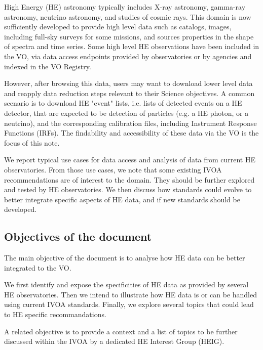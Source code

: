 \documentclass[11pt,a4paper]{ivoa}
\begin{document}
High Energy (HE) astronomy typically includes X-ray astronomy, gamma-ray astronomy,
neutrino astronomy, and studies of cosmic rays. This domain is now sufficiently developed to provide high level data such as catalogs, images, including full-sky surveys for some missions, and sources properties in the shape of spectra and time series.
Some high level HE observations have been included in the VO, via data access endpoints provided by observatories or by agencies and indexed in the VO Registry.

However, after browsing this data, users may want to download lower level data and reapply data reduction steps relevant to their Science objectives. A common scenario is to download HE "event" lists, i.e. lists of detected events on a HE detector, that are expected to be detection of particles (e.g. a HE photon, or a neutrino), and the corresponding calibration files, including Instrument Response Functions (IRFs). The findability and accessibility of these data via the VO is the focus of this note.

We report typical use cases for data access and analysis of data from current HE observatories. From those use
cases, we note that some existing IVOA recommendations are of interest to the domain. They should be further explored and tested
by HE observatories. We then discuss how standards could evolve to better integrate specific aspects of HE data, and if
new standards should be developed.

\subsection{Objectives of the document}

The main objective of the document is to analyse how HE data can be better integrated to the VO.

We  first identify and expose the specificities of HE data as provided by several HE observatories. Then we intend to illustrate how HE data is or can be handled using current IVOA standards. Finally, we explore several topics that could lead to HE specific recommandations.

A related objective is to provide a context and a list of topics to be further discussed within the IVOA by a dedicated HE Interest Group (HEIG).
\end{document}
